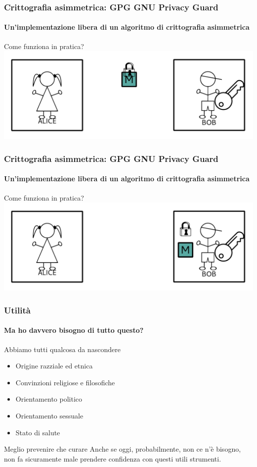 \documentclass{beamer}
\begin{document}
\begin{frame}
  \frametitle{Crittografia asimmetrica: GPG GNU Privacy Guard}
  \framesubtitle{Un'implementazione libera di un algoritmo di crittografia asimmetrica}

  \begin{block}{Come funziona in pratica?}
    \centering
    \includegraphics[width=.9\linewidth]{img/ab4.pdf}
  \end{block}
\end{frame}

\begin{frame}
  \frametitle{Crittografia asimmetrica: GPG GNU Privacy Guard}
  \framesubtitle{Un'implementazione libera di un algoritmo di crittografia asimmetrica}

  \begin{block}{Come funziona in pratica?}
    \centering
    \includegraphics[width=.9\linewidth]{img/ab5.pdf}
  \end{block}
\end{frame}

\begin{frame}
  \frametitle{Utilità}
  \framesubtitle{Ma ho davvero bisogno di tutto questo?}

  \begin{block}{Abbiamo tutti qualcosa da nascondere}
    \begin{itemize}
      \item Origine razziale ed etnica
      \item Convinzioni religiose e filosofiche
      \item Orientamento politico
      \item Orientamento sessuale
      \item Stato di salute
    \end{itemize}
  \end{block}

  \pause
  \begin{alertblock}{Meglio prevenire che curare}
    Anche se oggi, probabilmente, non ce n'è bisogno, non fa sicuramente
    male prendere confidenza con questi utili strumenti.
  \end{alertblock}
\end{frame}
\end{document}
